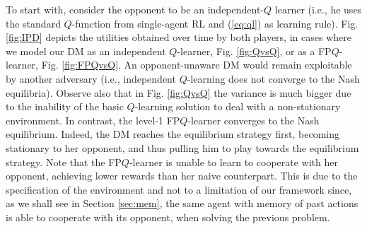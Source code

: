 To start with, consider the opponent to be an independent-$Q$ learner
(i.e., he uses the standard $Q$-function from single-agent RL and (\ref{eq:ql}) as learning rule). Fig. \ref{fig:IPD} depicts the utilities obtained over time by both players, 
in cases where we model our DM as an independent $Q$-learner,
Fig. \ref{fig:QvsQ}, or as a FP$Q$-learner, Fig. \ref{fig:FPQvsQ}.
An opponent-unaware DM would remain exploitable by
another adversary (i.e., independent $Q$-learning does not converge
to the Nash equilibria).
Observe also that in Fig. \ref{fig:QvsQ} the variance is much bigger due to the inability of the basic $Q$-learning 
solution to deal with a non-stationary environment.
In contrast, the level-1 FP$Q$-learner converges to the Nash equilibrium.
Indeed, the DM reaches the equilibrium strategy first, becoming stationary to her opponent,
and thus pulling him to play towards the equilibrium strategy.
Note that the FP$Q$-learner is unable to learn to
cooperate with her opponent, achieving lower rewards than her naive
counterpart. This is due to the specification of the environment
and not to a limitation of our framework since, as we 
shall see in Section \ref{sec:mem}, the same agent with memory of past
actions is able to cooperate with its opponent, 
when solving the previous problem.
  
